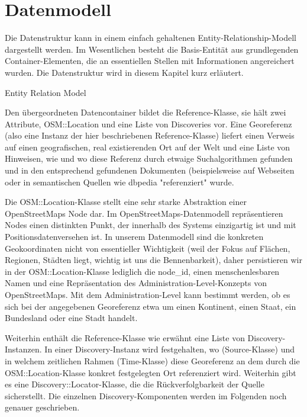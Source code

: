 \section{Datenmodell}
\label{datenmodell}

Die Datenstruktur kann in einem einfach gehaltenen Entity-Relationship-Modell dargestellt werden. Im Wesentlichen besteht die Basis-Entität aus grundlegenden Container-Elementen, die an essentiellen Stellen mit Informationen angereichert wurden. Die Datenstruktur wird in diesem Kapitel kurz erläutert.

Entity Relation Model

Den übergeordneten Datencontainer bildet die Reference-Klasse, sie hält zwei Attribute, OSM::Location und eine Liste von Discoveries vor. Eine Georeferenz (also eine Instanz der hier beschriebenen Reference-Klasse) liefert einen Verweis auf einen geografischen, real existierenden Ort auf der Welt und eine Liste von Hinweisen, wie und wo diese Referenz durch etwaige Suchalgorithmen gefunden und in den entsprechend gefundenen Dokumenten (beispielsweise auf Webseiten oder in semantischen Quellen wie dbpedia "referenziert" wurde.

Die OSM::Location-Klasse stellt eine sehr starke Abstraktion einer OpenStreetMaps Node\cite{OSMnode} dar. Im OpenStreetMaps-Datenmodell repräsentieren Nodes einen distinkten Punkt, der innerhalb des Systems einzigartig ist und mit Positionsdatenversehen ist. In unserem Datenmodell sind die konkreten Geokoordinaten nicht von essentieller Wichtigkeit (weil der Fokus auf Flächen, Regionen, Städten liegt, wichtig ist uns die Bennenbarkeit), daher persistieren wir in der OSM::Location-Klasse lediglich die node_id, einen menschenlesbaren Namen und eine Repräsentation des Administration-Level-Konzepts von OpenStreetMaps\cite{OSMadminlevel}. Mit dem Administration-Level kann bestimmt werden, ob es sich bei der angegebenen Georeferenz etwa um einen Kontinent, einen Staat, ein Bundesland oder eine Stadt handelt.

Weiterhin enthält die Reference-Klasse wie erwähnt eine Liste von Discovery-Instanzen. In einer Discovery-Instanz wird festgehalten, wo (Source-Klasse) und in welchem zeitlichen Rahmen (Time-Klasse) diese Georeferenz an dem durch die OSM::Location-Klasse konkret festgelegten Ort referenziert wird. Weiterhin gibt es eine Discovery::Locator-Klasse, die die Rückverfolgbarkeit der Quelle sicherstellt. Die einzelnen Discovery-Komponenten werden im Folgenden noch genauer geschrieben.

